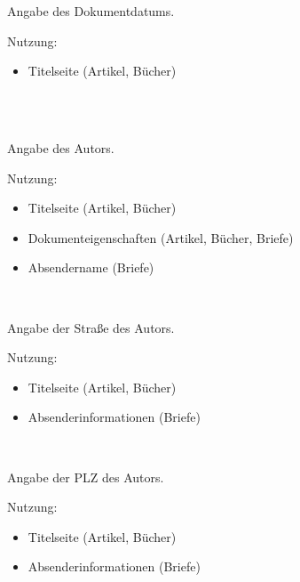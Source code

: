 \DescribeMacro{\date}
Angabe des Dokumentdatums.

Nutzung:
\begin{itemize}
	\item Titelseite (Artikel, Bücher)
\end{itemize}

\begin{nutzung}
		\>\\
	\beispiel
		\>\\
		\>
\end{nutzung}

\DescribeMacro{\author}
Angabe des Autors.

Nutzung:
\begin{itemize}
	\item Titelseite (Artikel, Bücher)
	\item Dokumenteigenschaften (Artikel, Bücher, Briefe)
	\item Absendername (Briefe)
\end{itemize}

\begin{nutzung}
		\>\\
	\beispiel
		\>
\end{nutzung}

\DescribeMacro{\strasse}
Angabe der Straße des Autors.

Nutzung:
\begin{itemize}
	\item Titelseite (Artikel, Bücher)
	\item Absenderinformationen (Briefe)
\end{itemize}

\begin{nutzung}
		\>\\
	\beispiel
		\>
\end{nutzung}

\DescribeMacro{\plz}
Angabe der PLZ des Autors.

Nutzung:
\begin{itemize}
	\item Titelseite (Artikel, Bücher)
	\item Absenderinformationen (Briefe)
\end{itemize}

\begin{nutzung}
		\>\\
	\beispiel
		\>
\end{nutzung}

